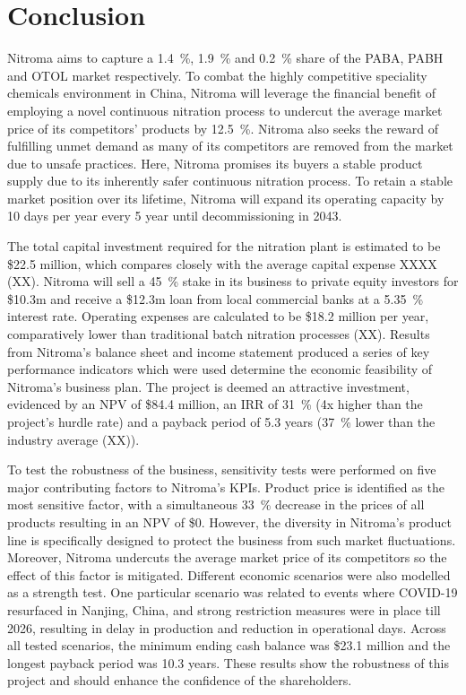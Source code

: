 \section{Conclusion}
Nitroma aims to capture a \SI{1.4}{\percent}, \SI{1.9}{\percent} and \SI{0.2}{\percent} share of the PABA, PABH and OTOL market respectively. To combat the highly competitive speciality chemicals environment in China, Nitroma will leverage the financial benefit of employing a novel continuous nitration process to undercut the average market price of its competitors’ products by \SI{12.5}{\percent}. Nitroma also seeks the reward of fulfilling unmet demand as many of its competitors are removed from the market due to unsafe practices. Here, Nitroma promises its buyers a stable product supply due to its inherently safer continuous nitration process. To retain a stable market position over its lifetime, Nitroma will expand its operating capacity by 10 days per year every 5 year until decommissioning in 2043.

The total capital investment required for the nitration plant is estimated to be \$22.5 million, which compares closely with the average capital expense XXXX (XX). Nitroma will sell a \SI{45}{\percent} stake in its business to private equity investors for \$10.3m and receive a \$12.3m loan from local commercial banks at a \SI{5.35}{\percent} interest rate. Operating expenses are calculated to be \$18.2 million per year, comparatively lower than traditional batch nitration processes (XX).  Results from Nitroma’s balance sheet and income statement produced a series of key performance indicators which were used determine the economic feasibility of Nitroma’s business plan. The project is deemed an attractive investment, evidenced by an NPV of \$84.4 million, an IRR of \SI{31}{\percent} (4x higher than the project’s hurdle rate) and a payback period of 5.3 years (\SI{37}{\percent} lower than the industry average (XX)).

To test the robustness of the business, sensitivity tests were performed on five major contributing factors to Nitroma’s KPIs. Product price is identified as the most sensitive factor, with a simultaneous \SI{33}{\percent} decrease in the prices of all products resulting in an NPV of \$0. However, the diversity in Nitroma’s product line is specifically designed to protect the business from such market fluctuations. Moreover, Nitroma undercuts the average market price of its competitors so the effect of this factor is mitigated. Different economic scenarios were also modelled as a strength test. One particular scenario was related to events where COVID-19 resurfaced in Nanjing, China, and strong restriction measures were in place till 2026, resulting in delay in production and reduction in operational days. Across all tested scenarios, the minimum ending cash balance was \$23.1 million and the longest payback period was 10.3 years. These results show the robustness of this project and should enhance the confidence of the shareholders.